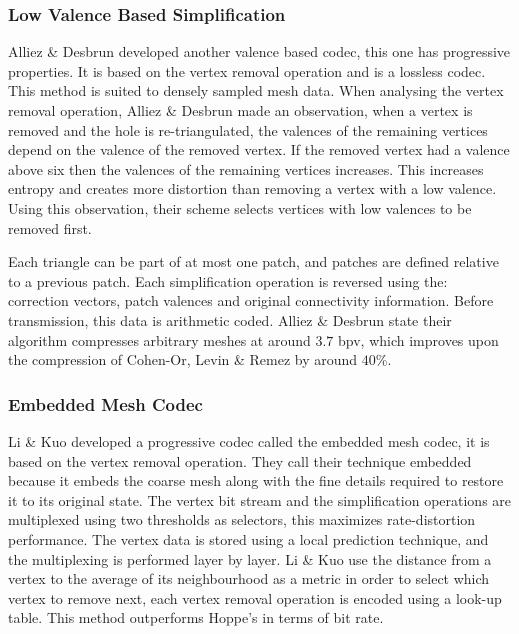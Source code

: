 \subsubsection{Low Valence Based Simplification}

Alliez \& Desbrun \cite{Alliez01Progressive} developed another valence based codec, this one has progressive properties. It is based on the vertex removal operation and is a lossless codec. This method is suited to densely sampled mesh data. When analysing the vertex removal operation, Alliez \& Desbrun made an observation, when a vertex is removed and the hole is re-triangulated, the valences of the remaining vertices depend on the valence of the removed vertex. If the removed vertex had a valence above six then the valences of the remaining vertices increases. This increases entropy and creates more distortion than removing a vertex with a low valence. Using this observation, their scheme selects vertices with low valences to be removed first.

Each triangle can be part of at most one patch, and patches are defined relative to a previous patch. Each simplification operation is reversed using the: correction vectors, patch valences and original connectivity information. Before transmission, this data is arithmetic coded. Alliez \& Desbrun state their algorithm compresses arbitrary meshes at around $3.7$ bpv, which improves upon the compression of Cohen-Or, Levin \& Remez \cite{CohenOr99Progressive} by around $40\%$.

\subsubsection{Embedded Mesh Codec}

Li \& Kuo \cite{Li98Progressive} developed a progressive codec called the embedded mesh codec, it is based on the vertex removal operation. They call their technique embedded because it embeds the coarse mesh along with the fine details required to restore it to its original state. The vertex bit stream and the simplification operations are multiplexed using two thresholds as selectors, this maximizes rate-distortion performance. The vertex data is stored using a local prediction technique, and the multiplexing is performed layer by layer. Li \& Kuo use the distance from a vertex to the average of its neighbourhood as a metric in order to select which vertex to remove next, each vertex removal operation is encoded using a look-up table. This method outperforms Hoppe's \cite{Hoppe96Progressive} in terms of bit rate.

